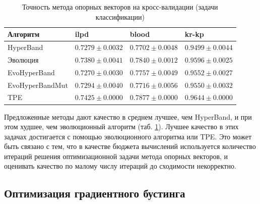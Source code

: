 \documentclass[a4paper,12pt]{article}
\begin{document}
\begin{table}[h]
\centering
\begin{tabular}{|l|l|l|l|}
\hline
Алгоритм               & ilpd                         & blood                        & kr-kp                         \\ \hline
HyperBand              & $0.7279 \pm 0.0032$          & $0.7702 \pm 0.0048$          & $0.9499 \pm 0.0044$          \\ \hline
Эволюция               & $0.7380 \pm 0.0041$          & $0.7840 \pm 0.0012$          & $0.9596 \pm 0.0025$          \\ \hline
EvoHyperBand           & $0.7270 \pm 0.0030$          & $0.7757 \pm 0.0049$          & $0.9552 \pm 0.0027$          \\ \hline
EvoHyperBandMut & $0.7294 \pm 0.0040$          & $0.7716 \pm 0.0056$          & $0.9550 \pm 0.0032$          \\ \hline
TPE                    & $\mathbf{0.7425 \pm 0.0000}$ & $\mathbf{0.7877 \pm 0.0000}$ & $\mathbf{0.9644 \pm 0.0000}$ \\ \hline
\end{tabular}
\caption{Точность метода опорных векторов на кросс-валидации (задачи классификации)}
\label{tab:svm}
\end{table}

Предложенные методы дают качество в среднем лучшее, чем HyperBand, и при этом худшее, чем эволюционный алгоритм (таб. \ref{tab:svm}). Лучшее качество в этих задачах достигается с помощью эволюционного алгоритма или TPE. Это может быть связано с тем, что в качестве бюджета вычислений используется количество итераций решения оптимизационной задачи метода опорных векторов, и оценивать качество по малому числу итераций до сходимости некорректно.

\subsection{Оптимизация градиентного бустинга}
\end{document}
